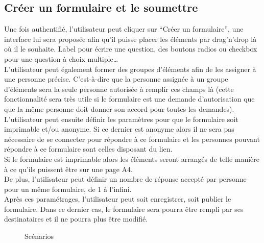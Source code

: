 \documentclass{sigplanconf}
\begin{document}
\subsection{Créer un formulaire et le soumettre}
Une fois authentifié, l'utilisateur peut cliquer sur “Créer un formulaire”, une interface lui sera proposée afin qu’il puisse placer les éléments par drag’n’drop là où il le souhaite. Label pour écrire une question, des boutons radios ou checkbox pour une question à choix multiple…\\
L’utilisateur peut également former des groupes d’éléments afin de les assigner à une personne précise. C’est-à-dire que la personne assignée à un groupe d’éléments sera la seule personne autorisée à remplir ces champs là (cette fonctionnalité sera très utile si le formulaire est une demande d’autorisation que que la même personne doit donner son accord pour toutes les demandes).\\
L’utilisateur peut ensuite définir les paramètres pour que le formulaire soit imprimable et/ou anonyme. Si ce dernier est anonyme alors il ne sera pas nécessaire de se connecter pour répondre à ce formulaire et les personnes pouvant répondre à ce formulaire sont celles disposant du lien.\\
Si le formulaire est imprimable alors les éléments seront arrangés de telle manière à ce qu’ils puissent être sur une page A4.\\
De plus, l’utilisateur peut définir un nombre de réponse accepté par personne pour un même formulaire, de 1 à l’infini.\\
Après ces paramétrages, l’utilisateur peut soit enregistrer, soit publier le formulaire. Dans ce dernier cas, le formulaire sera pourra être rempli par ses destinataires et il ne pourra plus être modifié.\\

\begin{figure}
\begin{center}
\end{center}
\caption{Scénarios}
\label{scenarios}
\end{figure}
\end{document}
